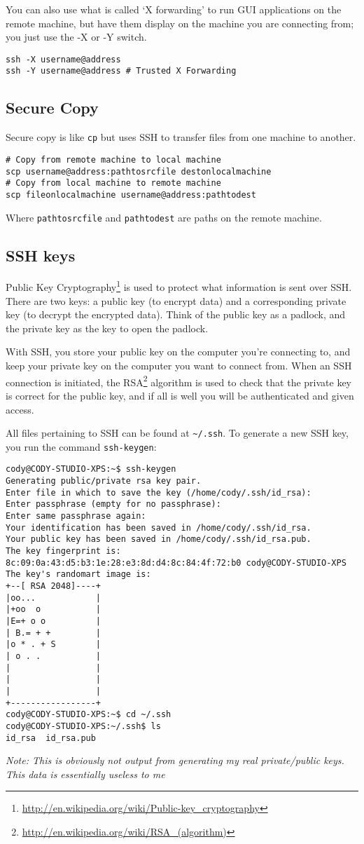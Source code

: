 \documentclass{article}
\begin{document}
You can also use what is called `X forwarding' to run GUI applications on the remote machine, but have them display on the machine you are connecting from; you just use the -X or -Y switch.
\begin{verbatim}
ssh -X username@address
ssh -Y username@address # Trusted X Forwarding
\end{verbatim}
\subsection{Secure Copy}
Secure copy is like \texttt{cp} but uses SSH to transfer files from one machine to another.
\begin{verbatim}
# Copy from remote machine to local machine
scp username@address:pathtosrcfile destonlocalmachine
# Copy from local machine to remote machine
scp fileonlocalmachine username@address:pathtodest
\end{verbatim}
Where \texttt{pathtosrcfile} and \texttt{pathtodest} are paths on the remote machine.

\subsection{SSH keys}
Public Key Cryptography\footnote{\url{http://en.wikipedia.org/wiki/Public-key_cryptography}} is used to protect what information is sent over SSH. There are two keys: a public key (to encrypt data) and a corresponding private key (to decrypt the encrypted data). Think of the public key as a padlock, and the private key as the key to open the padlock. 

With SSH, you store your public key on the computer you're connecting to, and keep your private key on the computer you want to connect from. When an SSH connection is initiated, the RSA\footnote{\url{http://en.wikipedia.org/wiki/RSA_(algorithm)}} algorithm is used to check that the private key is correct for the public key, and if all is well you will be authenticated and given access.

All files pertaining to SSH can be found at \texttt{\textasciitilde/.ssh}. To generate a new SSH key, you run the command \texttt{ssh-keygen}:
\begin{verbatim}
cody@CODY-STUDIO-XPS:~$ ssh-keygen
Generating public/private rsa key pair.
Enter file in which to save the key (/home/cody/.ssh/id_rsa): 
Enter passphrase (empty for no passphrase): 
Enter same passphrase again: 
Your identification has been saved in /home/cody/.ssh/id_rsa.
Your public key has been saved in /home/cody/.ssh/id_rsa.pub.
The key fingerprint is:
8c:09:0a:43:d5:b3:1e:28:e3:8d:d4:8c:84:4f:72:b0 cody@CODY-STUDIO-XPS
The key's randomart image is:
+--[ RSA 2048]----+
|oo...            |
|+oo  o           |
|E=+ o o          |
| B.= + +         |
|o * . + S        |
| o . .           |
|                 |
|                 |
|                 |
+-----------------+
cody@CODY-STUDIO-XPS:~$ cd ~/.ssh
cody@CODY-STUDIO-XPS:~/.ssh$ ls
id_rsa  id_rsa.pub
\end{verbatim}
\emph{Note: This is obviously not output from generating my real private/public keys. This data is essentially useless to me}
\end{document}
